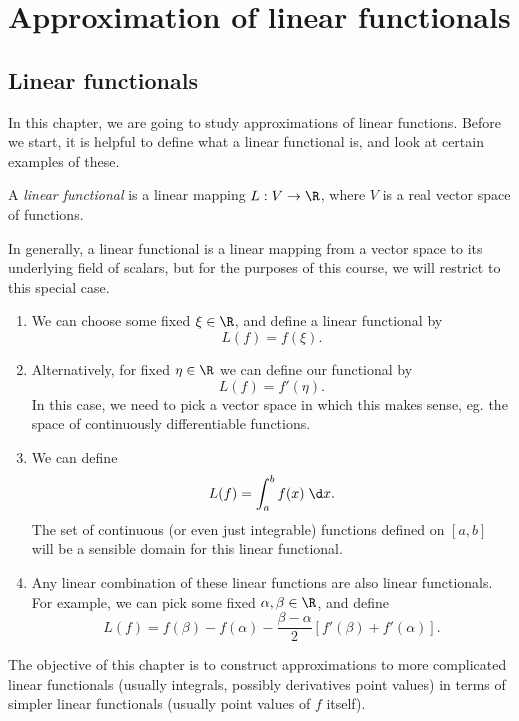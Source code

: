 \documentclass[a4paper]{article}
\begin{document}
\section{Approximation of linear functionals}
\subsection{Linear functionals}
In this chapter, we are going to study approximations of linear functions. Before we start, it is helpful to define what a linear functional is, and look at certain examples of these.

\begin{defi}
  A \emph{linear functional} is a linear mapping $L: V \to \R$, where $V$ is a real vector space of functions.
\end{defi}
In generally, a linear functional is a linear mapping from a vector space to its underlying field of scalars, but for the purposes of this course, we will restrict to this special case.

\begin{eg}\leavevmode
  \begin{enumerate}
    \item We can choose some fixed $\xi \in \R$, and define a linear functional by
      \[
        L(f) = f(\xi).
      \]
    \item Alternatively, for fixed $\eta \in \R$ we can define our functional by
      \[
        L(f) = f'(\eta).
      \]
      In this case, we need to pick a vector space in which this makes sense, eg. the space of continuously differentiable functions.
    \item We can define
      \[
        L(f) = \int_a^b f(x)\;\d x.
      \]
      The set of continuous (or even just integrable) functions defined on $[a, b]$ will be a sensible domain for this linear functional.
    \item Any linear combination of these linear functions are also linear functionals. For example, we can pick some fixed $\alpha, \beta \in \R$, and define
      \[
        L(f) = f(\beta) - f(\alpha) - \frac{\beta - \alpha}{2} [f'(\beta) + f'(\alpha)].
      \]
  \end{enumerate}
\end{eg}
The objective of this chapter is to construct approximations to more complicated linear functionals (usually integrals, possibly derivatives point values) in terms of simpler linear functionals (usually point values of $f$ itself).
\end{document}
